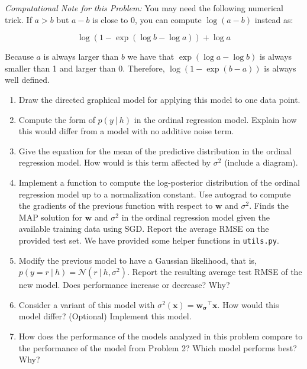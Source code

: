 \documentclass[10pt]{harvardml}
\theoremstyle{plain}
\begin{document}
\vspace{0.5cm }
\noindent
\textit{Computational Note for this Problem:} You may need the following numerical trick.
If $a > b $ but $a-b$ is close to 0, you can compute $\log(a-b)$
instead as:

\[\log(1 - \exp(\log b - \log a))+\log a \]

\noindent Because $a$ is always larger than $b$ we have that $\exp(\log a- \log b )$
is always smaller than 1 and larger than 0. Therefore,
$\log(1 - \exp(b - a))$ is always well defined.


\begin{problem}
\begin{enumerate}
\vspace{-0.1cm}
~

\item Draw the directed graphical model for applying this model to one data point.

\item Compute the form of  $p(y\ |\ h)$ in the ordinal regression model. Explain
  how this would differ from a model with no additive noise term.

\vspace{-0.1cm}


\item Give the equation for the mean of the predictive distribution in the ordinal regression model.
How would is this term affected by $\sigma^2$ (include a diagram).

\vspace{-0.1cm}
\item Implement a function to compute the log-posterior distribution of the ordinal
regression model up to a normalization constant. Use autograd to compute
the gradients of the previous function with respect to $\mathbf{w}$ and
$\sigma^2$. Finds the MAP solution for $\mathbf{w}$ and
  $\sigma^2$ in the ordinal regression model given the available
  training data using SGD. Report the average RMSE on the provided test set. We have provided some helper
  functions in \texttt{utils.py}.



\vspace{-0.1cm}
\item Modify the previous model to have a Gaussian likelihood, that
  is, $p(y=r\ |\ h)=\mathcal{N}(r\ | \ h,\sigma^2)$. Report the resulting
  average test RMSE of the new model. Does performance increase or
  decrease? Why?  \vspace{-0.1cm}

\vspace{-0.1cm}
\item Consider a variant of this model with
  $\sigma^2(\mathbf{x}) = \mathbf{w_{\sigma}}^\top \mathbf{x}$. How would this
  model differ? (Optional) Implement this model.

\vspace{-0.1cm}
\item How does the performance of the models analyzed in this problem
  compare to the performance of the model from Problem 2? Which model
  performs best? Why?

\end{enumerate}
\end{problem}
\end{document}
